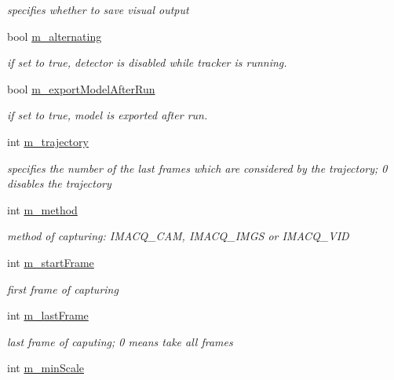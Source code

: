 \begin{DoxyCompactItemize}
\begin{DoxyCompactList}\small\item\em specifies whether to save visual output \end{DoxyCompactList}\item 
bool \hyperlink{classtld_1_1Settings_ae4a5b3fb575a1a49823f8305f3aefded}{m\-\_\-alternating}
\begin{DoxyCompactList}\small\item\em if set to true, detector is disabled while tracker is running. \end{DoxyCompactList}\item 
bool \hyperlink{classtld_1_1Settings_a5d0b425a526e5f7f78c758bfde3d9ee9}{m\-\_\-export\-Model\-After\-Run}
\begin{DoxyCompactList}\small\item\em if set to true, model is exported after run. \end{DoxyCompactList}\item 
int \hyperlink{classtld_1_1Settings_a56281480120f9cb2dbf69022cf97a30a}{m\-\_\-trajectory}
\begin{DoxyCompactList}\small\item\em specifies the number of the last frames which are considered by the trajectory; 0 disables the trajectory \end{DoxyCompactList}\item 
int \hyperlink{classtld_1_1Settings_a2438efb226c38f806bf1b3e023aa3760}{m\-\_\-method}
\begin{DoxyCompactList}\small\item\em method of capturing\-: I\-M\-A\-C\-Q\-\_\-\-C\-A\-M, I\-M\-A\-C\-Q\-\_\-\-I\-M\-G\-S or I\-M\-A\-C\-Q\-\_\-\-V\-I\-D \end{DoxyCompactList}\item 
int \hyperlink{classtld_1_1Settings_ac63c6dfae7c0be1fc167608dd52e1d7f}{m\-\_\-start\-Frame}
\begin{DoxyCompactList}\small\item\em first frame of capturing \end{DoxyCompactList}\item 
int \hyperlink{classtld_1_1Settings_a4935fe002dd6358506813d7c48ec5322}{m\-\_\-last\-Frame}
\begin{DoxyCompactList}\small\item\em last frame of caputing; 0 means take all frames \end{DoxyCompactList}\item 
int \hyperlink{classtld_1_1Settings_a46e4d9f59b1f87508cf0ad9a154fdc21}{m\-\_\-min\-Scale}

\end{DoxyCompactItemize}
